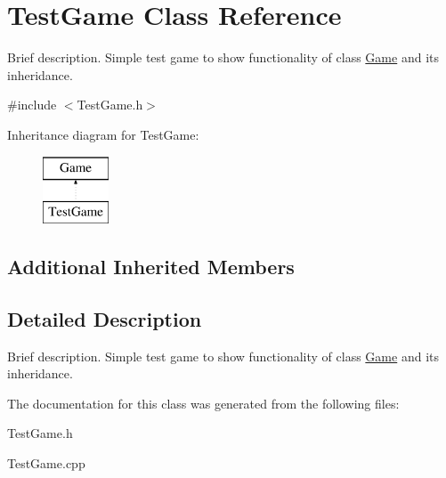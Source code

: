\hypertarget{class_test_game}{\section{Test\-Game Class Reference}
\label{class_test_game}
}


Brief description. Simple test game to show functionality of class \hyperlink{class_game}{Game} and its inheridance.  




{\ttfamily \#include $<$Test\-Game.\-h$>$}

Inheritance diagram for Test\-Game\-:\begin{figure}[H]
\begin{center}
\leavevmode
\includegraphics[height=2.000000cm]{class_test_game}
\end{center}
\end{figure}
\subsection*{Additional Inherited Members}


\subsection{Detailed Description}
Brief description. Simple test game to show functionality of class \hyperlink{class_game}{Game} and its inheridance. 

The documentation for this class was generated from the following files\-:\begin{DoxyCompactItemize}
\item 
Test\-Game.\-h\item 
Test\-Game.\-cpp\end{DoxyCompactItemize}
